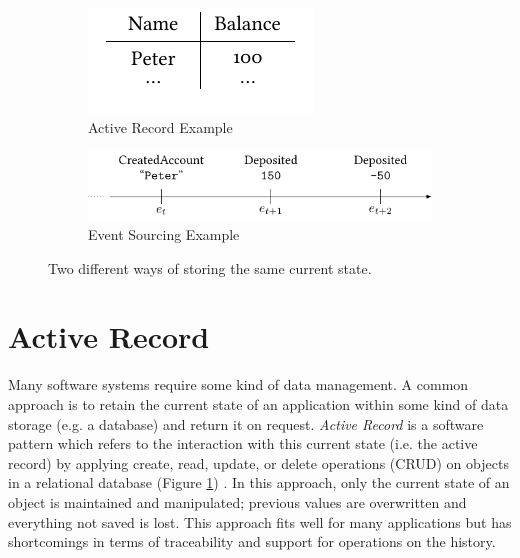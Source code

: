 \begin{figure}[t]
	\centering
	\begin{subfigure}[t!]{0.29\textwidth}
        \includegraphics[width=\textwidth]
		{../illustrations/table.pdf}
	\caption{
		Active Record Example
	}
	\label{fig:table}
	\end{subfigure}
	\begin{subfigure}[t!]{0.67\textwidth}
	       \includegraphics[width=\textwidth]
			{../illustrations/account-stream.pdf}
		\caption{
			Event Sourcing Example
		}
		\label{fig:log}
	\end{subfigure}
	\caption{Two different ways of storing the same current state.}
\end{figure}

\section{Active Record}
Many software systems require some kind of data management. A common approach
is to retain the current state of an application within some kind of data 
storage (e.g. a database) and return it on request. \emph{Active Record} is a 
software pattern which refers to the interaction with this current state (i.e. 
the active record) by applying create, read, update, or delete operations
(CRUD) on objects in a relational database (Figure \ref{fig:table}) 
\cite{Fowler2002}. 
In this approach, only the current state of an object is maintained and 
manipulated; previous values are overwritten and everything not saved is 
lost. This approach fits well for many applications but has shortcomings 
in terms of traceability and support for operations on the history.

